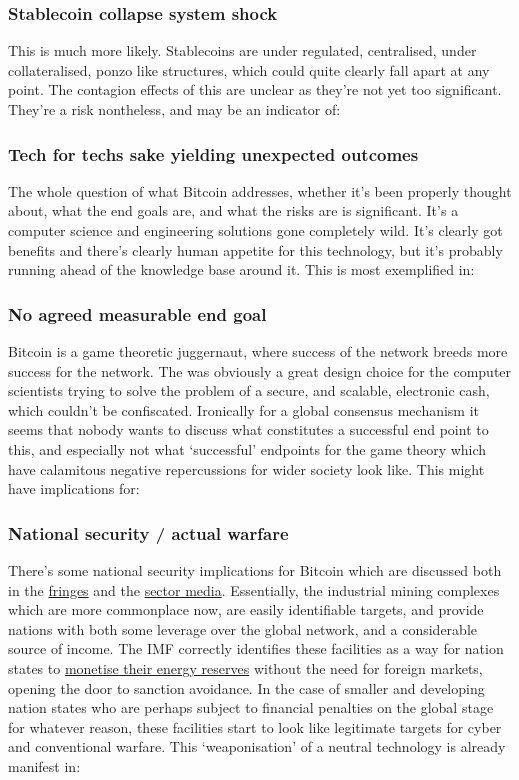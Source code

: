 \subsubsection{Stablecoin collapse system shock}
This is much more likely. Stablecoins are under regulated, centralised, under collateralised, ponzo like structures, which could quite clearly fall apart at any point. The contagion effects of this are unclear as they're not yet too significant. They're a risk nontheless, and may be an indicator of:
\subsubsection{Tech for techs sake yielding unexpected outcomes}
The whole question of what Bitcoin addresses, whether it's been properly thought about, what the end goals are, and what the risks are is significant. It's a computer science and engineering solutions gone completely wild. It's clearly got benefits and there's clearly human appetite for this technology, but it's probably running ahead of the knowledge base around it. This is most exemplified in:
\subsubsection{No agreed measurable end goal}
 Bitcoin is a game theoretic juggernaut, where success of the network breeds more success for the network. The was obviously a great design choice for the computer scientists trying to solve the problem of a secure, and scalable, electronic cash, which couldn't be confiscated. Ironically for a global consensus mechanism it seems that nobody wants to discuss what constitutes a successful end point to this, and especially not what `successful' endpoints for the game theory which have calamitous negative repercussions for wider society look like.  This might have implications for:
\subsubsection{National security / actual warfare}
There's some national security implications for Bitcoin which are discussed both in the \href{https://twitter.com/JasonPLowery/status/1512775981693648897?}{fringes} and the \href{https://www.coindesk.com/layer2/2022/04/04/why-bitcoin-mining-is-a-matter-of-national-security/}{sector media}. Essentially, the industrial mining complexes which are more commonplace now, are easily identifiable targets, and provide nations with both some leverage over the global network, and a considerable source of income. The IMF correctly identifies these facilities as a way for nation states to \href{https://www.imf.org/en/Publications/GFSR/Issues/2022/04/19/global-financial-stability-report-april-2022}{monetise their energy reserves} without the need for foreign markets, opening the door to sanction avoidance. In the case of smaller and developing nation states who are perhaps subject to financial penalties on the global stage for whatever reason, these facilities start to look like legitimate targets for cyber and conventional warfare. This `weaponisation' of a neutral technology is already manifest in:

